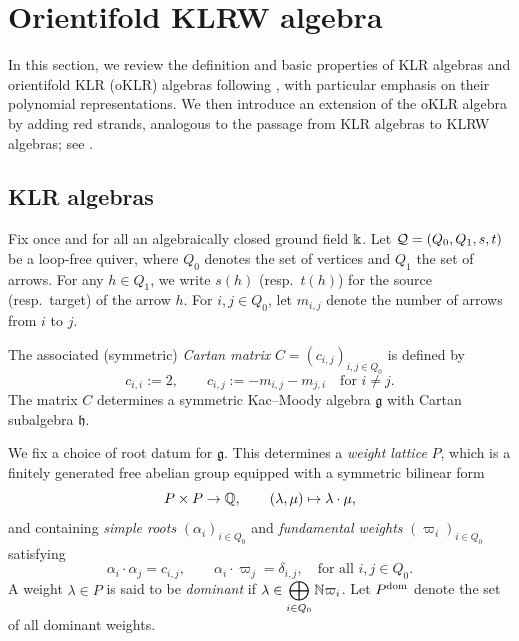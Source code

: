\section{Orientifold KLRW algebra}
In this section, we review the definition and basic properties of KLR algebras and orientifold KLR (oKLR) algebras following \cite{KL09,Rou,VV11,Prz23}, with particular emphasis on their polynomial representations. We then introduce an extension of the oKLR algebra by adding red strands, analogous to the passage from KLR algebras to KLRW algebras; see \cite{KTWWY19}.


\subsection{KLR algebras}
\label{sec:KLR}
Fix once and for all an algebraically closed ground field $\Bbbk$.
Let $\mathcal{Q} = (Q_0, Q_1, s, t)$ be a loop-free quiver, where $Q_0$ denotes the set of vertices and $Q_1$ the set of arrows.  
For any $h \in Q_1$, we write $s(h)$ (resp.\ $t(h)$) for the source (resp.\ target) of the arrow $h$.  
For $i, j \in Q_0$, let $m_{i,j}$ denote the number of arrows from $i$ to $j$.

The associated (symmetric) \emph{Cartan matrix} $C = (c_{i,j})_{i,j \in Q_0}$ is defined by
\[
c_{i,i} := 2, 
\qquad 
c_{i,j} := - m_{i,j} - m_{j,i} \quad \text{for } i \neq j .
\]
The matrix $C$ determines a symmetric Kac--Moody algebra $\mathfrak{g}$ with Cartan subalgebra $\mathfrak{h}$. 

We fix a choice of root datum for $\mathfrak{g}$.  
This determines a \emph{weight lattice} $P$, which is a finitely generated free abelian group equipped with a symmetric bilinear form
\[
P \times P \to \mathbb{Q}, 
\qquad 
(\lambda, \mu) \mapsto \lambda \cdot \mu ,
\]
and containing \emph{simple roots} $(\alpha_i)_{i \in Q_0}$ and \emph{fundamental weights} $(\varpi_i)_{i \in Q_0}$ satisfying
\[
\alpha_i \cdot \alpha_j = c_{i,j},
\qquad
\alpha_i \cdot \varpi_j = \delta_{i,j},
\quad \text{for all } i,j \in Q_0 .
\]
A weight $\lambda\in P$ is said to be \emph{dominant} if $\lambda\in \displaystyle\bigoplus_{i\in Q_0}\mathbb{N} \varpi_i$. Let $P^{\text{dom}}$ denote the set of all dominant weights. 


